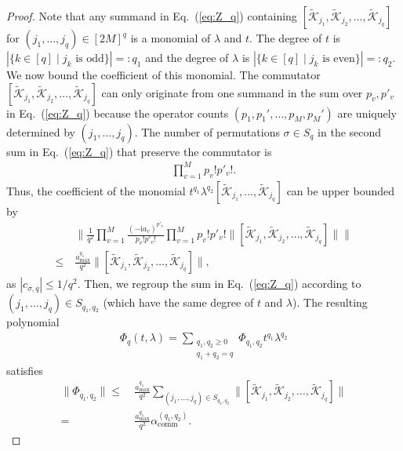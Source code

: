 \documentclass[aps,pra,reprint,groupedaddress,floatfix]{revtex4-2}
\newcommand{\eq}[1]{(\ref{eq:#1})}
\renewcommand{\i}{\mathrm{i}}
\renewcommand{\comm}{\mathrm{comm}}
\newcommand{\mc}{\mathcal}
\begin{document}
\begin{proof}
 	Note that any summand in Eq.~\eq{Z_q} containing $[\tilde{\mc K}_{j_1}, \tilde{\mc K}_{j_2}, \ldots, \tilde{\mc K}_{j_q}]$ for $(j_1, \ldots, j_q)\in [2M]^q$ is a monomial of $\lambda$ and $t$. The degree of $t$ is $|\{k\in [q]\mid j_k \text{ is odd}\}|=: q_1$ and the degree of $\lambda$ is $|\{k\in [q]\mid j_k \text{ is even}\}|=: q_2$. We now bound the coefficient of this monomial. The commutator $[\tilde{\mc K}_{j_1}, \tilde{\mc K}_{j_2}, \ldots, \tilde{\mc K}_{j_q}]$ can only originate from one summand in the sum over $p_v, p'_v$ in Eq.~\eq{Z_q} because the operator counts $(p_1, p_1', \ldots, p_M, p_M')$ are uniquely determined by $(j_1, \ldots, j_q)$. The number of permutations $\sigma\in S_q$ in the second sum in Eq.~\eq{Z_q} that preserve the commutator is
 	\begin{align*}
 	 	\prod_{v=1}^M p_v!p'_v!.
 	\end{align*}
 	Thus, the coefficient of the monomial $t^{q_1}\lambda^{q_2}[\tilde{\mc K}_{j_1}, \ldots, \tilde{\mc K}_{j_q}]$ can be upper bounded by
 	\begin{align*}
 	 	& \bigg\|\frac{1}{q^2}\prod_{v=1}^M \frac{(-\i a_v)^{p'_v}}{p_v!p'_v!}\prod_{v=1}^M p_v!p'_v!\big\|[\tilde{\mc K}_{j_1}, \tilde{\mc K}_{j_2}, \ldots, \tilde{\mc K}_{j_q}]\big\|\bigg\| \\
        \le~& \frac{a_{\max}^{q_1}}{q^2}  \big\|[\tilde{\mc K}_{j_1}, \tilde{\mc K}_{j_2}, \ldots, \tilde{\mc K}_{j_q}]\big\|,
 	\end{align*}
 	as $|c_{\sigma, q}|\le 1/q^2$. Then, we regroup the sum in Eq.~\eq{Z_q} according to $(j_1, \ldots, j_q)\in S_{q_1, q_2}$ (which have the same degree of $t$ and $\lambda$). The resulting polynomial
 	\begin{align*}
 	 	\Phi_q(t,\lambda) = \sum_{\substack{q_1, q_2 \ge 0\\q_1+q_2 = q}}\Phi_{q_1, q_2} t^{q_1}\lambda^{q_2}
 	\end{align*}
 	satisfies
 	\begin{align*}
 	 	\|\Phi_{q_1, q_2}\| \le~ &  \frac{a_{\max}^{q_1}}{q^2}\sum_{(j_1, \ldots, j_q)\in S_{q_1, q_2}} \big\|[\tilde{\mc K}_{j_1}, \tilde{\mc K}_{j_2}, \ldots, \tilde{\mc K}_{j_q}]\big\| \\
        =~& \frac{a_{\max}^{q_1}}{q^2}\alpha_{\comm}^{(q_1, q_2)}.
 	\end{align*}
\end{proof}
\end{document}
